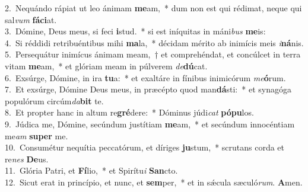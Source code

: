 {2.~}Nequándo rápiat ut leo ánimam \textbf{me}am,~* dum non est qui rédimat, neque qui sal\textit{vum} \textbf{fá}\textbf{ci}at.\\
{3.~}Dómine, Deus meus, si feci \textbf{i}stud.~* si est iníquitas in máni\textit{bus} \textbf{me}is:\\
{4.~}Si réddidi retribuéntibus mihi \textbf{ma}la,~* décidam mérito ab inimícis meis \textit{i}\textbf{ná}nis.\\
{5.~}Persequátur inimícus ánimam meam,~† et comprehéndat, et concúlcet in terra vitam \textbf{me}am,~* et glóriam meam in púlverem \textit{de}\textbf{dú}cat.\\
{6.~}Exsúrge, Dómine, in ira \textbf{tu}a:~* et exaltáre in fínibus inimicórum \textit{me}\textbf{ó}rum.\\
{7.~}Et exsúrge, Dómine Deus meus, in præcépto quod man\textbf{dá}sti:~* et synagóga populórum circúm\textit{da}\textbf{bit} te.\\
{8.~}Et propter hanc in altum re\textbf{gré}dere:~* Dóminus júdi\textit{cat} \textbf{pó}\textbf{pu}los.\\
{9.~}Júdica me, Dómine, secúndum justítiam \textbf{me}am,~* et secúndum innocéntiam me\textit{am} \textbf{su}\textbf{per} me.\\
{10.~}Consumétur nequítia peccatórum, et díriges \textbf{ju}stum,~* scrutans corda et re\textit{nes} \textbf{De}us.\\
{11.~}Glória Patri, et \textbf{Fí}lio,~* et Spirítu\textit{i} \textbf{San}cto.\\
{12.~}Sicut erat in princípio, et nunc, et \textbf{sem}per,~* et in sǽcula sæculó\textit{rum}. \textbf{A}men.\\
